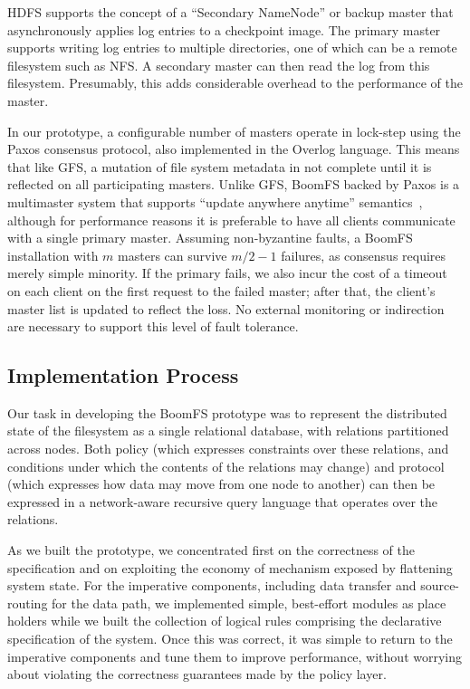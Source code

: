 \documentclass[twocolumn]{article}
\begin{document}
HDFS supports the concept of a ``Secondary NameNode'' or backup master
that asynchronously applies log entries to a checkpoint image.  The
primary master supports writing log entries to multiple directories,
one of which can be a remote filesystem such as NFS.  A secondary
master can then read the log from this filesystem.  Presumably, this
adds considerable overhead to the performance of the master.
 
In our prototype, a configurable number of masters operate in
lock-step using the Paxos consensus protocol, also implemented in the
Overlog language.  This means that like GFS, a mutation of file system
metadata in not complete until it is reflected on all participating
masters.  Unlike GFS, BoomFS backed by Paxos is a multimaster system that
supports ``update anywhere anytime''
semantics~\cite{dangers-of-replication}, although for performance
reasons it is preferable to have all clients communicate with a single
primary master.  Assuming non-byzantine faults, a BoomFS installation
with $m$ masters can survive $m/2 - 1$ failures, as consensus requires
merely simple minority.  If the primary fails, we also incur the cost
of a timeout on each client on the first request to the failed master;
after that, the client's master list is updated to reflect the loss.
No external monitoring or indirection are necessary to support this
level of fault tolerance.

\subsection{Implementation Process}
\label{decl-approach}
Our task in developing the BoomFS prototype was to represent the
distributed state of the filesystem as a single relational database,
with relations partitioned across nodes.  Both policy (which expresses
constraints over these relations, and conditions under which the
contents of the relations may change) and protocol (which expresses
how data may move from one node to another) can then be expressed in a
network-aware recursive query language that operates over the
relations.

As we built the prototype, we concentrated first on the correctness of
the specification and on exploiting the economy of mechanism exposed
by flattening system state.  For the imperative components, including
data transfer and source-routing for the data path, we implemented
simple, best-effort modules as place holders while we built the
collection of logical rules comprising the declarative specification
of the system.  Once this was correct, it was simple to return to the
imperative components and tune them to improve performance, without
worrying about violating the correctness guarantees made by the policy
layer.
\end{document}
